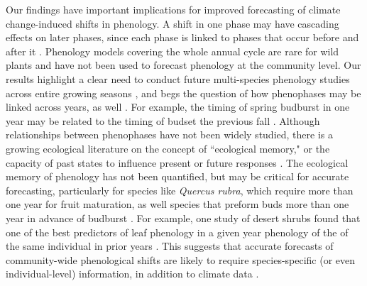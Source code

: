 \documentclass{article}
\begin{document}
\par Our findings have important implications for improved forecasting of climate change-induced shifts in phenology. A shift in one phase may have cascading effects on later phases, since each phase is linked to phases that occur before and after it \citep{wolkovich2014b}. Phenology models covering the whole annual cycle are rare for wild plants \citep[but see][]{chuine2001, li2016} and have not been used to forecast phenology at the community level. Our results highlight a clear need to conduct future multi-species phenology studies across entire growing seasons \citep{wolkovich2014}, and begs the question of how phenophases may be linked across years, as well \citep[e.g.,][]{elmendorf2016}. For example, the timing of spring budburst in one year may be related to the timing of budset the previous fall \citep {mimura2010}. Although relationships between phenophases have not been widely studied, there is a growing ecological literature on the concept of ``ecological memory," or the capacity of past states to influence present or future responses \citep {ogle2015}. The ecological memory of phenology has not been quantified, but may be critical for accurate forecasting, particularly for species like \emph{Quercus rubra}, which require more than one year for fruit maturation, as well species that preform buds more than one year in advance of budburst \citep{diggle1997,klimes2007}. For example, one study of desert shrubs found that one of the best predictors of leaf phenology in a given year phenology of the of the same individual in prior years \citep{cody2003}. This suggests that accurate forecasts of community-wide phenological shifts are likely to require species-specific (or even individual-level) information, in addition to climate data \citep{diez2012}.
\end{document}
